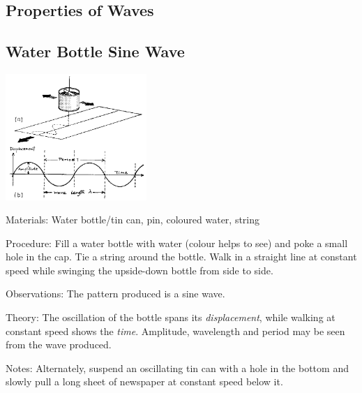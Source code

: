 \begin{multicols}{2}
\columnbreak


\section*{Properties of Waves}


\subsection{Water Bottle Sine Wave}

\begin{center}
\includegraphics[width=0.4\textwidth]{./img/source/sine-wave.png}
\end{center}

\begin{description*}
\item[Materials:]{Water bottle/tin can, pin, coloured water, string}
\item[Procedure:]{Fill a water bottle with water (colour helps to see) and poke a small hole in the cap. Tie a string around the bottle. Walk in a straight line at constant speed while swinging the upside-down bottle from side to side.}
\item[Observations:]{The pattern produced is a sine wave.}
\item[Theory:]{The oscillation of the bottle spans its \emph{displacement}, while walking at constant speed shows the \emph{time}. Amplitude, wavelength and period may be seen from the wave produced.}
\item[Notes:]{Alternately, suspend an oscillating tin can with a hole in the bottom and slowly pull a long sheet of newspaper at constant speed below it.}
\end{description*}


\end{multicols}
